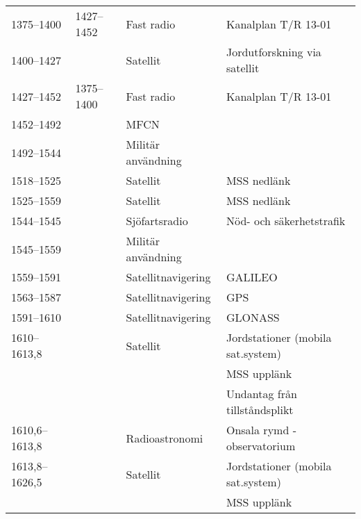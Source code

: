 \begin{landscape}
\begin{longtable}{llll}
	1375--1400         & 1427--1452         & Fast radio              & Kanalplan T/R 13-01                      \\
	1400--1427         &                    & Satellit                & Jordutforskning via satellit             \\
	1427--1452         & 1375--1400         & Fast radio              & Kanalplan T/R 13-01                      \\
	1452--1492         &                    & MFCN                    &  \\
	1492--1544         &                    & Militär användning      &  \\
	1518--1525         &                    & Satellit                & MSS nedlänk                              \\
	1525--1559         &                    & Satellit                & MSS nedlänk                              \\
	1544--1545         &                    & Sjöfartsradio           & Nöd- och säkerhetstrafik                 \\
	1545--1559         &                    & Militär användning      &  \\
	1559--1591         &                    & Satellitnavigering      & GALILEO                                  \\
	1563--1587         &                    & Satellitnavigering      & GPS                                      \\
	1591--1610         &                    & Satellitnavigering      & GLONASS                                  \\
	1610--1613,8       &                    & Satellit                & Jordstationer (mobila sat.system)        \\
	                   &                    &                         & MSS upplänk                              \\
	                   &                    &                         & Undantag från tillståndsplikt            \\
	1610,6--1613,8     &                    & Radioastronomi          & Onsala rymd - observatorium              \\
	1613,8--1626,5     &                    & Satellit                & Jordstationer (mobila sat.system)        \\
	                   &                    &                         & MSS upplänk                              \\

\end{longtable}
\end{landscape}

